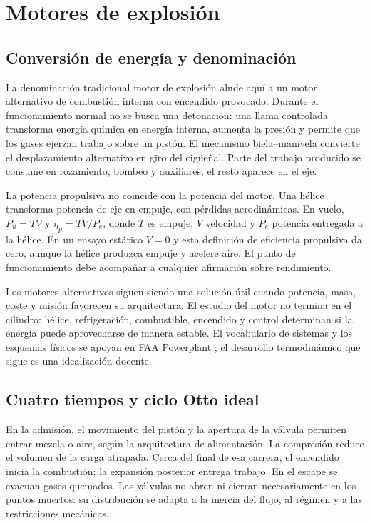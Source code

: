 \chapter{Motores de explosión}\label{ch:18}

\section{Conversión de energía y denominación}
La denominación tradicional motor de explosión alude aquí a un motor alternativo de combustión interna con encendido provocado. Durante el funcionamiento normal no se busca una detonación: una llama controlada transforma energía química en energía interna, aumenta la presión y permite que los gases ejerzan trabajo sobre un pistón. El mecanismo biela--manivela convierte el desplazamiento alternativo en giro del cigüeñal. Parte del trabajo producido se consume en rozamiento, bombeo y auxiliares; el resto aparece en el eje.

La potencia propulsiva no coincide con la potencia del motor. Una hélice transforma potencia de eje en empuje, con pérdidas aerodinámicas. En vuelo, $P_u=TV$ y $\eta_p=TV/P_e$, donde $T$ es empuje, $V$ velocidad y $P_e$ potencia entregada a la hélice. En un ensayo estático $V=0$ y esta definición de eficiencia propulsiva da cero, aunque la hélice produzca empuje y acelere aire. El punto de funcionamiento debe acompañar a cualquier afirmación sobre rendimiento.

Los motores alternativos siguen siendo una solución útil cuando potencia, masa, coste y misión favorecen su arquitectura. El estudio del motor no termina en el cilindro: hélice, refrigeración, combustible, encendido y control determinan si la energía puede aprovecharse de manera estable. El vocabulario de sistemas y los esquemas físicos se apoyan en FAA Powerplant \cite{FAA-POWERPLANT}; el desarrollo termodinámico que sigue es una idealización docente.


\section{Cuatro tiempos y ciclo Otto ideal}
En la admisión, el movimiento del pistón y la apertura de la válvula permiten entrar mezcla o aire, según la arquitectura de alimentación. La compresión reduce el volumen de la carga atrapada. Cerca del final de esa carrera, el encendido inicia la combustión; la expansión posterior entrega trabajo. En el escape se evacuan gases quemados. Las válvulas no abren ni cierran necesariamente en los puntos muertos: su distribución se adapta a la inercia del flujo, al régimen y a las restricciones mecánicas.

